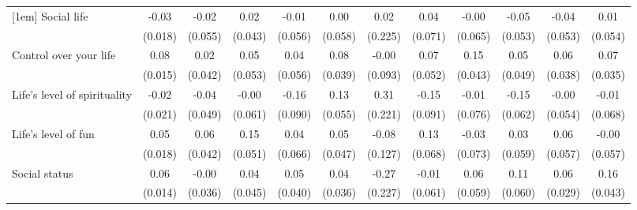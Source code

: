 {\begin{tabular}{l*{11}{c}}
[1em]
Social life     &    -0.03         &    -0.02         &     0.02         &    -0.01         &     0.00         &     0.02         &     0.04         &    -0.00         &    -0.05         &    -0.04         &     0.01         \\
                &  (0.018)         &  (0.055)         &  (0.043)         &  (0.056)         &  (0.058)         &  (0.225)         &  (0.071)         &  (0.065)         &  (0.053)         &  (0.053)         &  (0.054)         \\
[1em]
Control over your life&     0.08\sym{***}&     0.02         &     0.05         &     0.04         &     0.08\sym{*}  &    -0.00         &     0.07         &     0.15\sym{***}&     0.05         &     0.06         &     0.07\sym{*}  \\
                &  (0.015)         &  (0.042)         &  (0.053)         &  (0.056)         &  (0.039)         &  (0.093)         &  (0.052)         &  (0.043)         &  (0.049)         &  (0.038)         &  (0.035)         \\
[1em]
Life's level of spirituality&    -0.02         &    -0.04         &    -0.00         &    -0.16         &     0.13\sym{*}  &     0.31         &    -0.15         &    -0.01         &    -0.15\sym{*}  &    -0.00         &    -0.01         \\
                &  (0.021)         &  (0.049)         &  (0.061)         &  (0.090)         &  (0.055)         &  (0.221)         &  (0.091)         &  (0.076)         &  (0.062)         &  (0.054)         &  (0.068)         \\
[1em]
Life's level of fun&     0.05\sym{*}  &     0.06         &     0.15\sym{**} &     0.04         &     0.05         &    -0.08         &     0.13         &    -0.03         &     0.03         &     0.06         &    -0.00         \\
                &  (0.018)         &  (0.042)         &  (0.051)         &  (0.066)         &  (0.047)         &  (0.127)         &  (0.068)         &  (0.073)         &  (0.059)         &  (0.057)         &  (0.057)         \\
[1em]
Social status   &     0.06\sym{***}&    -0.00         &     0.04         &     0.05         &     0.04         &    -0.27         &    -0.01         &     0.06         &     0.11         &     0.06\sym{*}  &     0.16\sym{***}\\
                &  (0.014)         &  (0.036)         &  (0.045)         &  (0.040)         &  (0.036)         &  (0.227)         &  (0.061)         &  (0.059)         &  (0.060)         &  (0.029)         &  (0.043)         \\

\end{tabular}}
